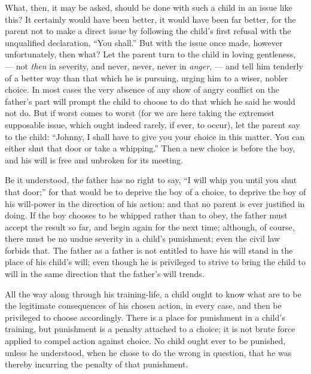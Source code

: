 \documentclass[
]{book}
\begin{document}
What, then, it may be asked, should be done with such a child in an issue like this? It certainly would have been better, it would have been far better, for the parent not to make a direct issue by following the child's first refusal with the unqualified declaration, ``You shall.'' But with the issue once made, however unfortunately, then what? Let the parent turn to the child in loving gentleness, --- not \emph{then} in severity, and never, never, never in \emph{anger}, --- and tell him tenderly of a better way than that which he is pursuing, urging him to a wiser, nobler choice. In most cases the very absence of any show of angry conflict on the father's part will prompt the child to choose to do that which he said he would not do. But if worst comes to worst (for we are here taking the extremest supposable issue, which ought indeed rarely, if ever, to occur), let the parent say to the child: ``Johnny, I shall have to give you your choice in this matter. You can either shut that door or take a whipping.'' Then a new choice is before the boy, and his will is free and unbroken for its meeting.

Be it understood, the father has no right to say, ``I will whip you until you shut that door;'' for that would be to deprive the boy of a choice, to deprive the boy of his will-power in the direction of his action: and that no parent is ever justified in doing. If the boy chooses to be whipped rather than to obey, the father must accept the result so far, and begin again for the next time; although, of course, there must be no undue severity in a child's punishment; even the civil law forbids that. The father as a father is not entitled to have his will stand in the place of his child's will; even though he is privileged to strive to bring the child to will in the same direction that the father's will trends.

All the way along through his training-life, a child ought to know what are to be the legitimate consequences of his chosen action, in every case, and then be privileged to choose accordingly. There is a place for punishment in a child's training, but punishment is a penalty attached to a choice; it is not brute force applied to compel action against choice. No child ought ever to be punished, unless he understood, when he chose to do the wrong in question, that he was thereby incurring the penalty of that punishment.
\end{document}

